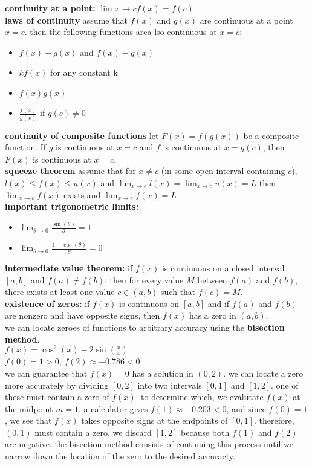 \documentclass{article}
\begin{document}
\textbf{continuity at a point:} $\lim{x \to c}f(x) = f(c)$\\

\textbf{laws of continuity} assume that $f(x)$ and $g(x)$ are continuous at a point $x = c$. then the following functions area lso continuous at $x = c$:
	\begin{itemize}
		\item $f(x) + g(x)$ and $f(x) - g(x)$
		\item $kf(x)$ for any constant k
		\item $f(x)g(x)$
		\item $\frac{f(x)}{g(x)}$ if $g(c) \neq 0$
	\end{itemize}

\textbf{continuity of composite functions} let $F(x) = f(g(x))$ be a composite function. If $g$ is continuous at $x = c$ and $f$ is continuous at $x = g(c)$, then $F(x)$ is continuous at $x = c$.\\

\textbf{squeeze theorem} assume that for $x \neq c$ (in some open interval containing $c$), $l(x) \leq f(x) \leq u(x)$ and $\lim_{x \to c}l(x) = \lim_{x \to c}u(x) = L$ then $\lim_{x \to c}f(x)$ exists and $\lim_{x \to c}f(x) = L$\\

\textbf{important trigonometric limits:}
	\begin{itemize}
		\item $\lim_{\theta \to 0}\frac{\sin(\theta)}{\theta} = 1$
		\item $\lim_{\theta \to 0}\frac{1 - \cos(\theta)}{\theta} = 0$
	\end{itemize}

\textbf{intermediate value theorem:} if $f(x)$ is continuous on a closed interval $[a, b]$ and $f(a) \neq f(b)$, then for every value $M$ between $f(a)$ and $f(b)$, there exists at least one value $c \in (a, b)$ such that $f(c) = M$.\\

\textbf{existence of zeros:} if $f(x)$ is continuous on $[a, b]$ and if $f(a)$ and $f(b)$ are nonzero and have opposite signs, then $f(x)$ has a zero in $(a, b)$.\\

we can locate zeroes of functions to arbitrary accuracy using the \textbf{bisection method}.\\
$f(x) = \cos^2(x) - 2\sin(\frac{x}{4})$\\
$f(0) = 1 > 0$, $f(2) \approx -0.786 < 0$\\
we can guarantee that $f(x) = 0$ has a solution in $(0, 2)$. we can locate a zero more accurately by dividing $[0, 2]$ into two intervals $[0, 1]$ and $[1, 2]$. one of these must contain a zero of $f(x)$. to determine which, we evalutate $f(x)$ at the midpoint $m = 1$. a calculator gives $f(1) \approx -0.203 < 0$, and since $f(0) = 1$, we see that $f(x)$ takes opposite signs at the endpoints of $[0, 1]$. therefore, $(0, 1)$ must contain a zero. we discard $[1, 2]$ because both $f(1)$ and $f(2)$ are negative. the bisection method consists of continuing this process until we narrow down the location of the zero to the desired accuracty.\\
\end{document}
